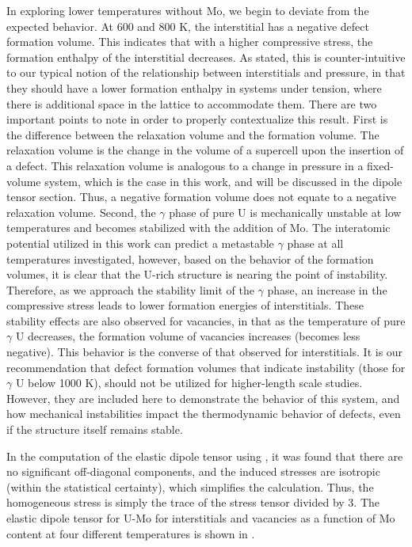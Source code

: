\documentclass[review]{elsarticle}
\begin{document}
In exploring lower temperatures without Mo, we begin to deviate from the expected behavior. At 600 and 800 K, the interstitial has a negative defect formation volume. This indicates that with a higher compressive stress, the formation enthalpy of the interstitial decreases. As stated, this is counter-intuitive to our typical notion of the relationship between interstitials and pressure, in that they should have a lower formation enthalpy in systems under tension, where there is additional space in the lattice to accommodate them. There are two important points to note in order to properly contextualize this result. First is the difference between the relaxation volume and the formation volume. The relaxation volume is the change in the volume of a supercell upon the insertion of a defect. This relaxation volume is analogous to a change in pressure in a fixed-volume system, which is the case in this work, and will be discussed in the dipole tensor section. Thus, a negative formation volume does not equate to a negative relaxation volume. Second, the $\gamma$ phase of pure U is mechanically unstable at low temperatures \cite{beeler2010} and becomes stabilized with the addition of Mo. The interatomic potential utilized in this work can predict a metastable $\gamma$ phase at all temperatures investigated, however, based on the behavior of the formation volumes, it is clear that the U-rich structure is nearing the point of instability. Therefore, as we approach the stability limit of the $\gamma$ phase, an increase in the compressive stress leads to lower formation energies of interstitials. These stability effects are also observed for vacancies, in that as the temperature of pure $\gamma$ U decreases, the formation volume of vacancies increases (becomes less negative). This behavior is the converse of that observed for interstitials. It is our recommendation that defect formation volumes that indicate instability (those for $\gamma$ U below 1000 K), should not be utilized for higher-length scale studies. However, they are included here to demonstrate the behavior of this system, and how mechanical instabilities impact the thermodynamic behavior of defects, even if the structure itself remains stable. 

In the computation of the elastic dipole tensor using , it was found that there are no significant off-diagonal components, and the induced stresses are isotropic (within the statistical certainty), which simplifies the calculation. Thus, the homogeneous stress is simply the trace of the stress tensor divided by 3. The elastic dipole tensor for U-Mo for interstitials and vacancies as a function of Mo content at four different temperatures is shown in . 
\end{document}
